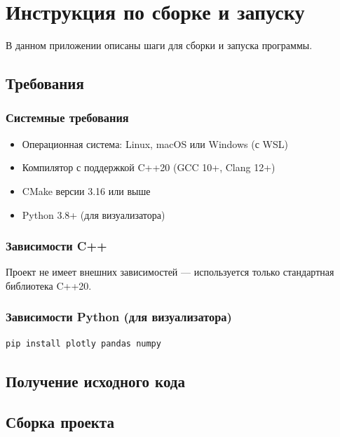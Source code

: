 \chapter{Инструкция по сборке и запуску}
\label{app:build}

В данном приложении описаны шаги для сборки и запуска программы.

\section{Требования}

\subsection{Системные требования}
\begin{itemize}
    \item Операционная система: Linux, macOS или Windows (с WSL)
    \item Компилятор с поддержкой C++20 (GCC 10+, Clang 12+)
    \item CMake версии 3.16 или выше
    \item Python 3.8+ (для визуализатора)
\end{itemize}

\subsection{Зависимости C++}
Проект не имеет внешних зависимостей — используется только стандартная библиотека C++20.

\subsection{Зависимости Python (для визуализатора)}
\begin{verbatim}
pip install plotly pandas numpy
\end{verbatim}

\section{Получение исходного кода}


\section{Сборка проекта}

